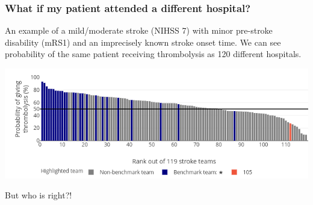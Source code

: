 \begin{frame}
\frametitle{What if my patient attended a different hospital?}

An example of a mild/moderate stroke (NIHSS 7) with minor pre-stroke disability (mRS1) and an imprecisely known stroke onset time. We can see probability of the same patient receiving thrombolysis as 120 different hospitals.



\begin{center}
\includegraphics[width=1\textwidth]{./images/choice_example}
\end{center}

\vspace{2mm}
But who is right?!
\end{frame}